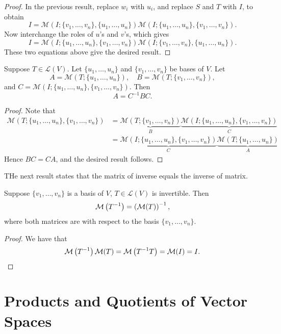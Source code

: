 \begin{proof}
In the previous result, replace $w_i$ with $u_i$, and replace $S$ and $T$ with $I$, to obtain
\[I=\mathcal{M}(I;\{v_1,\dots,v_n\},\{u_1,\dots,u_n\})\mathcal{M}(I;\{u_1,\dots,u_n\},\{v_1,\dots,v_n\}).\]
Now interchange the roles of $u$'s and $v$'s, which gives
\[I=\mathcal{M}(I;\{u_1,\dots,u_n\},\{v_1,\dots,v_n\})\mathcal{M}(I;\{v_1,\dots,v_n\},\{u_1,\dots,u_n\}).\]
These two equations above give the desired result.
\end{proof}

\begin{theorem}
Suppose $T\in\mathcal{L}(V)$. Let $\{u_1,\dots,u_n\}$ and $\{v_1,\dots,v_n\}$ be bases of $V$. Let
\[A=\mathcal{M}(T;\{u_1,\dots,u_n\}),\quad B=\mathcal{M}(T;\{v_1,\dots,v_n\}),\]
and $C=\mathcal{M}(I;\{u_1,\dots,u_n\},\{v_1,\dots,v_n\})$. Then
\begin{equation}
A=C^{-1}BC.
\end{equation}
\end{theorem}

\begin{proof}
Note that
\begin{align*}
\mathcal{M}(T;\{u_1,\dots,u_n\},\{v_1,\dots,v_n\})
&=\underbrace{\mathcal{M}(T;\{v_1,\dots,v_n\})}_{B}\underbrace{\mathcal{M}(I;\{u_1,\dots,u_n\},\{v_1,\dots,v_n\})}_{C}\\
&=\underbrace{\mathcal{M}(I;\{u_1,\dots,u_n\},\{v_1,\dots,v_n\})}_{C}\underbrace{\mathcal{M}(T;\{u_1,\dots,u_n\})}_{A}
\end{align*}
Hence $BC=CA$, and the desired result follows.
\end{proof}

THe next result states that the matrix of inverse equals the inverse of matrix.

\begin{lemma}
Suppose $\{v_1,\dots,v_n\}$ is a basis of $V$, $T\in\mathcal{L}(V)$ is invertible. Then
\[\mathcal{M}\left(T^{-1}\right)=\left(\mathcal{M}(T)\right)^{-1},\]
where both matrices are with respect to the basis $\{v_1,\dots,v_n\}$.
\end{lemma}

\begin{proof}
We have that
\[\mathcal{M}\left(T^{-1}\right)\mathcal{M}(T)=\mathcal{M}\left(T^{-1}T\right)=\mathcal{M}(I)=I.\]
\end{proof}
\pagebreak

\section{Products and Quotients of Vector Spaces}
